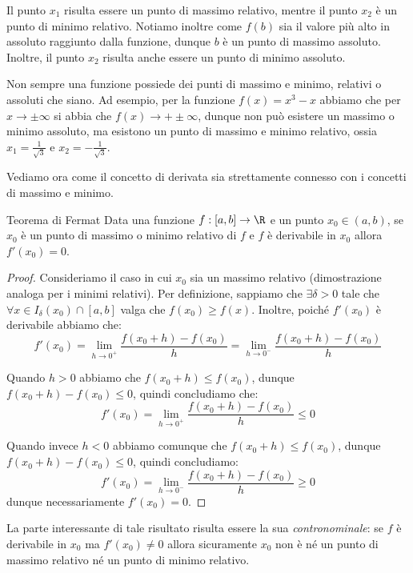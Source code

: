 \documentclass[a4paper, 12pt]{report}
\begin{document}
    Il punto $x_1$ risulta essere un punto di massimo relativo, mentre il punto $x_2$ è un punto di minimo relativo. Notiamo inoltre come $f(b)$ sia il valore più alto in assoluto raggiunto dalla funzione, dunque $b$ è un punto di massimo assoluto. Inoltre, il punto $x_2$ risulta anche essere un punto di minimo assoluto.

    Non sempre una funzione possiede dei punti di massimo e minimo, relativi o assoluti che siano. Ad esempio, per la funzione $f(x) = x^3-x$ abbiamo che per $x \to \pm\infty$ si abbia che $f(x) \to +\pm\infty$, dunque non può esistere un massimo o minimo assoluto, ma esistono un punto di massimo e minimo relativo, ossia $x_1 = \frac{1}{\sqrt{3}}$ e $x_2 = -\frac{1}{\sqrt{3}}$.

    Vediamo ora come il concetto di derivata sia strettamente connesso con i concetti di massimo e minimo.

    \begin{framedthm}{Teorema di Fermat}
        Data una funzione $f: [a,b] \to \R$ e un punto $x_0 \in (a,b)$, se $x_0$ è un punto di massimo o minimo relativo di $f$ e $f$ è derivabile in $x_0$ allora $f'(x_0) = 0$.
    \end{framedthm}

    \begin{proof}
        Consideriamo il caso in cui $x_0$ sia un massimo relativo (dimostrazione analoga per i minimi relativi). Per definizione, sappiamo che $\exists \delta > 0$ tale che $\forall x \in I_{\delta}(x_0) \cap [a,b]$ valga che $f(x_0) \geq f(x)$. Inoltre, poiché $f'(x_0)$ è derivabile abbiamo che:
        \[f'(x_0) = \lim_{h \to 0^+} \frac{f(x_0+h)-f(x_0)}{h} = \lim_{h \to 0^-} \frac{f(x_0+h)-f(x_0)}{h}\]

        Quando $h > 0$ abbiamo che $f(x_0 + h) \leq f(x_0)$, dunque $f(x_0 + h) - f(x_0) \leq 0$, quindi concludiamo che:
        \[ f'(x_0) = \lim_{h \to 0^+} \frac{f(x_0+h)-f(x_0)}{h} \leq 0\]

        Quando invece $h < 0$ abbiamo comunque che $f(x_0 + h) \leq f(x_0)$, dunque $f(x_0 + h) - f(x_0) \leq 0$, quindi concludiamo:
        \[ f'(x_0) = \lim_{h \to 0^-} \frac{f(x_0+h)-f(x_0)}{h} \geq 0\]
        dunque necessariamente $f'(x_0) = 0$.
    \end{proof}

    La parte interessante di tale risultato risulta essere la sua \textit{contronominale}: se $f$ è derivabile in $x_0$ ma $f'(x_0)\neq 0$ allora sicuramente $x_0$ non è né un punto di massimo relativo né un punto di minimo relativo.
\end{document}
